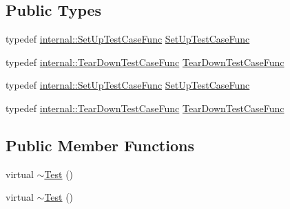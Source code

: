 \subsection*{\-Public \-Types}
\begin{DoxyCompactItemize}
\item 
typedef \hyperlink{namespacetesting_1_1internal_abdd2548fdbf05907e439e416dab030ec}{internal\-::\-Set\-Up\-Test\-Case\-Func} \hyperlink{classtesting_1_1Test_a2df065892efeff7ca91bb2d2fbe00975}{\-Set\-Up\-Test\-Case\-Func}
\item 
typedef \*
\hyperlink{namespacetesting_1_1internal_a0d7d11b7ce3a8f9d969e0dfb543dde3d}{internal\-::\-Tear\-Down\-Test\-Case\-Func} \hyperlink{classtesting_1_1Test_a4ae7a4e140c70dee5c9cb82e13ae570c}{\-Tear\-Down\-Test\-Case\-Func}
\item 
typedef \hyperlink{namespacetesting_1_1internal_abdd2548fdbf05907e439e416dab030ec}{internal\-::\-Set\-Up\-Test\-Case\-Func} \hyperlink{classtesting_1_1Test_a2df065892efeff7ca91bb2d2fbe00975}{\-Set\-Up\-Test\-Case\-Func}
\item 
typedef \*
\hyperlink{namespacetesting_1_1internal_a0d7d11b7ce3a8f9d969e0dfb543dde3d}{internal\-::\-Tear\-Down\-Test\-Case\-Func} \hyperlink{classtesting_1_1Test_a4ae7a4e140c70dee5c9cb82e13ae570c}{\-Tear\-Down\-Test\-Case\-Func}
\end{DoxyCompactItemize}
\subsection*{\-Public \-Member \-Functions}
\begin{DoxyCompactItemize}
\item 
virtual \hyperlink{classtesting_1_1Test_a6fba67d17f23fe2f810e5f79f4e91538}{$\sim$\-Test} ()
\item 
virtual \hyperlink{classtesting_1_1Test_a9081fb76c435427816f374b174d87c35}{$\sim$\-Test} ()
\end{DoxyCompactItemize}
